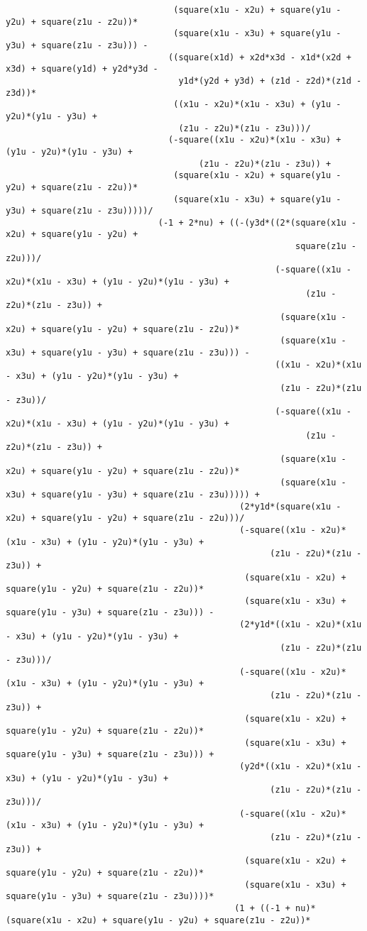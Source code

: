\begin{lstlisting}
								 (square(x1u - x2u) + square(y1u - y2u) + square(z1u - z2u))*
								 (square(x1u - x3u) + square(y1u - y3u) + square(z1u - z3u))) - 
								((square(x1d) + x2d*x3d - x1d*(x2d + x3d) + square(y1d) + y2d*y3d - 
								  y1d*(y2d + y3d) + (z1d - z2d)*(z1d - z3d))*
								 ((x1u - x2u)*(x1u - x3u) + (y1u - y2u)*(y1u - y3u) + 
								  (z1u - z2u)*(z1u - z3u)))/
								(-square((x1u - x2u)*(x1u - x3u) + (y1u - y2u)*(y1u - y3u) + 
									  (z1u - z2u)*(z1u - z3u)) + 
								 (square(x1u - x2u) + square(y1u - y2u) + square(z1u - z2u))*
								 (square(x1u - x3u) + square(y1u - y3u) + square(z1u - z3u)))))/
							  (-1 + 2*nu) + ((-(y3d*((2*(square(x1u - x2u) + square(y1u - y2u) + 
														 square(z1u - z2u)))/
													 (-square((x1u - x2u)*(x1u - x3u) + (y1u - y2u)*(y1u - y3u) + 
														   (z1u - z2u)*(z1u - z3u)) + 
													  (square(x1u - x2u) + square(y1u - y2u) + square(z1u - z2u))*
													  (square(x1u - x3u) + square(y1u - y3u) + square(z1u - z3u))) - 
													 ((x1u - x2u)*(x1u - x3u) + (y1u - y2u)*(y1u - y3u) + 
													  (z1u - z2u)*(z1u - z3u))/
													 (-square((x1u - x2u)*(x1u - x3u) + (y1u - y2u)*(y1u - y3u) + 
														   (z1u - z2u)*(z1u - z3u)) + 
													  (square(x1u - x2u) + square(y1u - y2u) + square(z1u - z2u))*
													  (square(x1u - x3u) + square(y1u - y3u) + square(z1u - z3u))))) + 
											  (2*y1d*(square(x1u - x2u) + square(y1u - y2u) + square(z1u - z2u)))/
											  (-square((x1u - x2u)*(x1u - x3u) + (y1u - y2u)*(y1u - y3u) + 
													(z1u - z2u)*(z1u - z3u)) + 
											   (square(x1u - x2u) + square(y1u - y2u) + square(z1u - z2u))*
											   (square(x1u - x3u) + square(y1u - y3u) + square(z1u - z3u))) - 
											  (2*y1d*((x1u - x2u)*(x1u - x3u) + (y1u - y2u)*(y1u - y3u) + 
													  (z1u - z2u)*(z1u - z3u)))/
											  (-square((x1u - x2u)*(x1u - x3u) + (y1u - y2u)*(y1u - y3u) + 
													(z1u - z2u)*(z1u - z3u)) + 
											   (square(x1u - x2u) + square(y1u - y2u) + square(z1u - z2u))*
											   (square(x1u - x3u) + square(y1u - y3u) + square(z1u - z3u))) + 
											  (y2d*((x1u - x2u)*(x1u - x3u) + (y1u - y2u)*(y1u - y3u) + 
													(z1u - z2u)*(z1u - z3u)))/
											  (-square((x1u - x2u)*(x1u - x3u) + (y1u - y2u)*(y1u - y3u) + 
													(z1u - z2u)*(z1u - z3u)) + 
											   (square(x1u - x2u) + square(y1u - y2u) + square(z1u - z2u))*
											   (square(x1u - x3u) + square(y1u - y3u) + square(z1u - z3u))))*
											 (1 + ((-1 + nu)*(square(x1u - x2u) + square(y1u - y2u) + square(z1u - z2u))*

\end{lstlisting}
